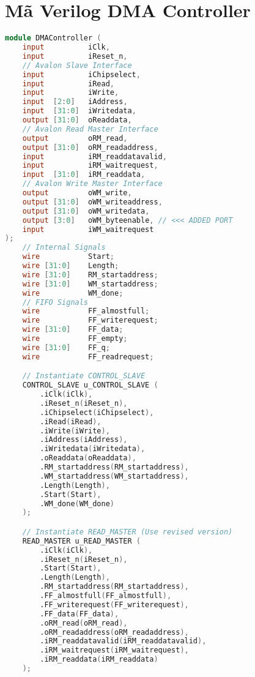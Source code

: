 \section{Mã Verilog DMA Controller}
\label{app:verilog_dmac}
\begin{lstlisting}[language=Verilog, caption={DMAController.v - DMA Controller Top Module}, label=lst:verilog_dmacontroller]
module DMAController (
    input          iClk,
    input          iReset_n,
    // Avalon Slave Interface
    input          iChipselect,
    input          iRead,
    input          iWrite,
    input  [2:0]   iAddress,
    input  [31:0]  iWritedata,
    output [31:0]  oReaddata,
    // Avalon Read Master Interface
    output         oRM_read,
    output [31:0]  oRM_readaddress,
    input          iRM_readdatavalid,
    input          iRM_waitrequest,
    input  [31:0]  iRM_readdata,
    // Avalon Write Master Interface
    output         oWM_write,
    output [31:0]  oWM_writeaddress,
    output [31:0]  oWM_writedata,
    output [3:0]   oWM_byteenable, // <<< ADDED PORT
    input          iWM_waitrequest
);
    // Internal Signals
    wire           Start;
    wire [31:0]    Length;
    wire [31:0]    RM_startaddress;
    wire [31:0]    WM_startaddress;
    wire           WM_done;
    // FIFO Signals
    wire           FF_almostfull;
    wire           FF_writerequest;
    wire [31:0]    FF_data;
    wire           FF_empty;
    wire [31:0]    FF_q;
    wire           FF_readrequest;

    // Instantiate CONTROL_SLAVE
    CONTROL_SLAVE u_CONTROL_SLAVE (
        .iClk(iClk),
        .iReset_n(iReset_n),
        .iChipselect(iChipselect),
        .iRead(iRead),
        .iWrite(iWrite),
        .iAddress(iAddress),
        .iWritedata(iWritedata),
        .oReaddata(oReaddata),
        .RM_startaddress(RM_startaddress),
        .WM_startaddress(WM_startaddress),
        .Length(Length),
        .Start(Start),
        .WM_done(WM_done)
    );

    // Instantiate READ_MASTER (Use revised version)
    READ_MASTER u_READ_MASTER (
        .iClk(iClk),
        .iReset_n(iReset_n),
        .Start(Start),
        .Length(Length),
        .RM_startaddress(RM_startaddress),
        .FF_almostfull(FF_almostfull),
        .FF_writerequest(FF_writerequest),
        .FF_data(FF_data),
        .oRM_read(oRM_read),
        .oRM_readaddress(oRM_readaddress),
        .iRM_readdatavalid(iRM_readdatavalid),
        .iRM_waitrequest(iRM_waitrequest),
        .iRM_readdata(iRM_readdata)
    );


\end{lstlisting}
